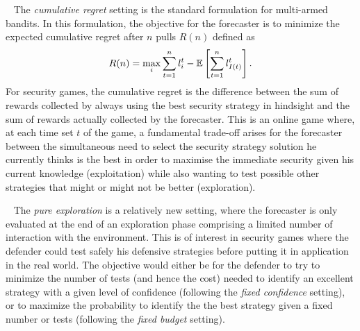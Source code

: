 

\textbullet~ The \textit{cumulative regret} setting is the standard formulation for multi-armed bandits. In this formulation, the objective for the forecaster is to minimize the expected cumulative regret after $n$ pulls $R(n)$ defined as
%
\begin{equation*}
R(n)=\max_i\sum^n_{t=1} l^t_{i}-{\mathbb{E}}\left[\sum_{t=1}^n l^t_{I(t)}\right].
\end{equation*}
%
For security games, the cumulative regret is the difference between the sum of rewards collected by always using the best security strategy in hindsight and the sum of rewards actually collected by the forecaster.
This is an online game where, at each time set $t$ of the game, a fundamental trade-off arises for the forecaster between the simultaneous need to select the security strategy solution he currently thinks is the best in order to maximise the immediate security given his current knowledge  (exploitation)  while also wanting to test possible other strategies that might or might not be better (exploration).





\textbullet~ The \textit{pure exploration} is a relatively new setting, where the forecaster is only evaluated at the end of an exploration phase comprising a limited number of interaction with the environment. %
This is of interest in security games where the defender could test safely his defensive strategies before putting it in application in the real world.
The objective would either be for the defender to try to minimize the number of tests (and hence the cost) needed to identify an excellent strategy with a given level of confidence
(following the \textit{fixed confidence} setting\cite{Maron93HR,Even-Dar06AE}), or to maximize the probability to identify the the best strategy given a fixed number or tests (following the \textit{fixed budget} setting\cite{Bubeck09PE,Audibert10BA}).%

